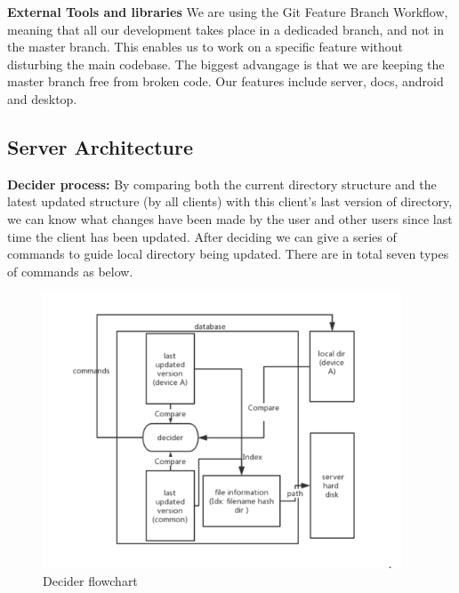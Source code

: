 \documentclass{article}
\begin{document}
\textbf{External Tools and libraries}
We are using the Git Feature Branch Workflow, meaning that all our development takes place in a dedicaded branch, and not in the master branch. This enables us to work on a specific feature without disturbing the main codebase. The biggest advangage is that we are keeping the master branch free from broken code. Our features include server, docs, android and desktop.

\subsection{Server Architecture}
\textbf{Decider process:} By comparing both the current directory structure and the latest updated structure (by all clients) with this client's last version of directory, we can know what changes have been made by the user and other users since last time the client has been updated. After deciding we can give a series of commands to guide local directory being updated. There are in total seven types of commands as below.

\begin{figure}[H]
    \centering
    \includegraphics[width=0.95\textwidth]{decider}
    \caption{Decider flowchart}
    \label{fig:decider1}
\end{figure}
\end{document}
